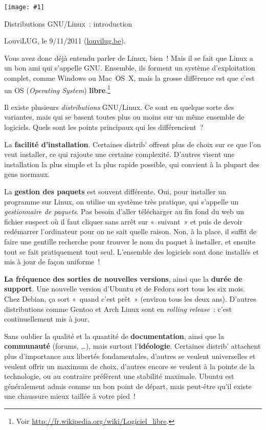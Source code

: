 \documentclass[a5paper,11pt]{article}
\def\titre#1#2{
  \noindent
  \begin{minipage}{0.14\linewidth}
  \texttt{[image: \#1]}
  \end{minipage}
  \begin{minipage}{0.85\linewidth}
    {\LARGE #2}

    \begin{flushright}
      LouviLUG, le 9/11/2011 (\url{louvilug.be}).
    \end{flushright}
  \end{minipage}

  \vspace{0.5cm}
}
\begin{document}
\titre{tux.pdf}{Distributions GNU/Linux~: introduction}

Vous avez donc déjà entendu parler de Linux, bien~! Mais il se fait que Linux a
un bon ami qui s'appelle GNU. Ensemble, ils forment un système d'exploitation
complet, comme Windows ou Mac~OS~X, mais la grosse différence est que c'est un
OS (\textit{Operating System}) \textbf{libre}.\footnote{Voir
\url{http://fr.wikipedia.org/wiki/Logiciel_libre}.}

\bigskip Il existe plusieurs \textit{distributions} GNU/Linux. Ce sont en
quelque sorte des variantes, mais qui se basent toutes plus ou moins sur un même
ensemble de logiciels. Quels sont les points principaux qui les différencient~?

\bigskip La \textbf{facilité d'installation}. Certaines distrib' offrent plus de
choix sur ce que l'on veut installer, ce qui rajoute une certaine complexité.
D'autres visent une installation la plus simple et la plus rapide possible, qui
convient à la plupart des gens normaux.

\bigskip La \textbf{gestion des paquets} est souvent différente. Oui, pour
installer un programme sur Linux, on utilise un système très pratique, qui
s'appelle un \textit{gestionnaire de paquets}. Pas besoin d'aller télécharger au
fin fond du web un fichier suspect où il faut cliquer sans arrêt sur «~suivant~»
et puis de devoir redémarrer l'ordinateur pour on ne sait quelle raison. Non, à
la place, il suffit de faire une gentille recherche pour trouver le nom du
paquet à installer, et ensuite tout se fait pratiquement tout seul. L'ensemble
des logiciels sont donc installés et mis à jour de façon uniforme~!

\bigskip  \textbf{La fréquence des sorties de nouvelles versions}, ainsi que la
\textbf{durée de support}. Une nouvelle version d'Ubuntu et de Fedora sort
tous les six mois. Chez Debian, ça sort «~quand c'est prêt~» (environ tous les
deux ans). D'autres distributions comme Gentoo et Arch Linux sont en
\textit{rolling release}~: c'est continuellement mis à jour.

\bigskip  Sans oublier la qualité et la quantité de \textbf{documentation},
ainsi que la \textbf{communauté} (forums, \ldots), mais surtout
l'\textbf{idéologie}. Certaines distrib' attachent plus d'importance aux
libertés fondamentales, d'autres se veulent universelles et veulent offrir un
maximum de choix, d'autres encore se veulent à la pointe de la technologie, ou
au contraire préfèrent une stabilité maximale. Ubuntu est généralement admis
comme un bon point de départ, mais peut-être qu'il existe une chaussure mieux
taillée à votre pied~!
\end{document}
